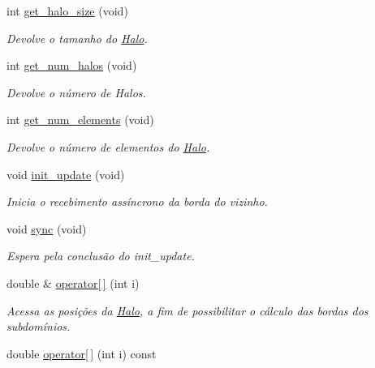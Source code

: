 \begin{DoxyCompactItemize}
int \hyperlink{classHalo_ae19759b97579ff67e8503cb46a69d786}{get\_\-halo\_\-size} (void)
\begin{DoxyCompactList}\small\item\em Devolve o tamanho do \hyperlink{classHalo}{Halo}. \item\end{DoxyCompactList}\item 
int \hyperlink{classHalo_ae432b6c70a8146d6e03863928e3c9bd8}{get\_\-num\_\-halos} (void)
\begin{DoxyCompactList}\small\item\em Devolve o número de Halos. \item\end{DoxyCompactList}\item 
int \hyperlink{classHalo_a8e4ee7b51272939a0ffeae9dc7f364d8}{get\_\-num\_\-elements} (void)
\begin{DoxyCompactList}\small\item\em Devolve o número de elementos do \hyperlink{classHalo}{Halo}. \item\end{DoxyCompactList}\item 
void \hyperlink{classHalo_af6ec299cf31527dea4a92f994ed2c458}{init\_\-update} (void)
\begin{DoxyCompactList}\small\item\em Inicia o recebimento assíncrono da borda do vizinho. \item\end{DoxyCompactList}\item 
void \hyperlink{classHalo_aff104eacb831738e61d54855a3259b37}{sync} (void)
\begin{DoxyCompactList}\small\item\em Espera pela conclusão do init\_\-update. \item\end{DoxyCompactList}\item 
double \& \hyperlink{classHalo_a24173356d80c075ce91c0efa4ec2796c}{operator\mbox{[}$\,$\mbox{]}} (int i)
\begin{DoxyCompactList}\small\item\em Acessa as posições da \hyperlink{classHalo}{Halo}, a fim de possibilitar o cálculo das bordas dos subdomínios. \item\end{DoxyCompactList}\item 
double \hyperlink{classHalo_ab448a5a0de13574527ca06653d05e049}{operator\mbox{[}$\,$\mbox{]}} (int i) const 

\end{DoxyCompactItemize}
